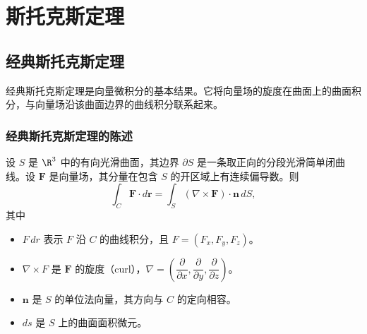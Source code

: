 \section{斯托克斯定理}
\label{sec:3.7}
\subsection{经典斯托克斯定理}
经典斯托克斯定理是向量微积分的基本结果。它将向量场的旋度在曲面上的曲面积分，与向量场沿该曲面边界的曲线积分联系起来。

\subsubsection{经典斯托克斯定理的陈述}
设 $S$ 是 $\R^3$ 中的有向光滑曲面，其边界 $\partial S$ 是一条取正向的分段光滑简单闭曲线。设 $\symbf{F}$ 是向量场，其分量在包含 $S$ 的开区域上有连续偏导数。则
\[
  \int_C\symbf{F}\cdot d\symbf{r}
    =\int_S(\nabla\times\symbf{F})\cdot\symbf{n}\,dS,
\]
其中
\begin{itemize}
\item $F\,dr$ 表示 $F$ 沿 $C$ 的曲线积分，且 $F=(F_x,F_y,F_z)$。
\item $\nabla\times F$ 是 $\symbf{F}$ 的旋度（curl），$\nabla=\left(\dfrac{\partial}{\partial x},\dfrac{\partial}{\partial y},\dfrac{\partial}{\partial z}\right)$。
\item $\symbf{n}$ 是 $S$ 的单位法向量，其方向与 $C$ 的定向相容。
\item $ds$ 是 $S$ 上的曲面面积微元。
\end{itemize}

